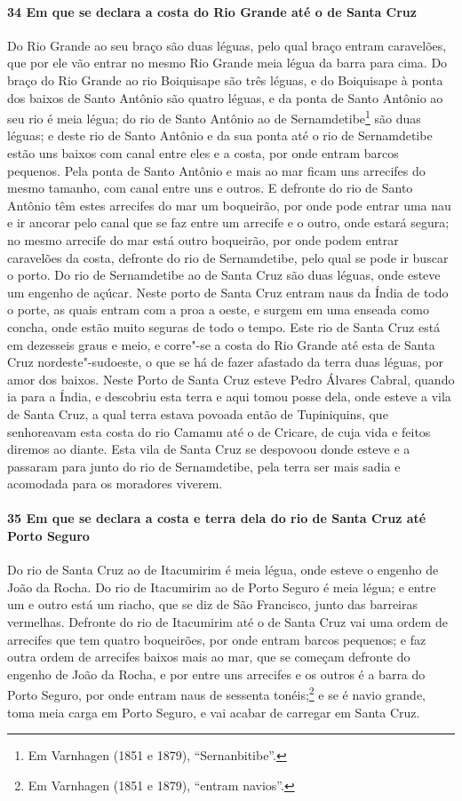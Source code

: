 \begin{linenumbers}
\paragraph{34 Em que se declara a costa do Rio Grande até o de Santa Cruz} \quad
Do Rio Grande ao seu braço são duas léguas, pelo qual braço entram caravelões, que por ele
vão entrar no mesmo Rio Grande meia légua da barra para cima. Do braço do Rio Grande ao
rio Boiquisape são três léguas, e do Boiquisape à ponta dos baixos de Santo Antônio são
quatro léguas, e da ponta de Santo Antônio ao seu rio é meia légua; do rio de Santo
Antônio ao de Sernamdetibe\footnote{ Em Varnhagen (1851 e 1879), ``Sernanbitibe''.} são
duas léguas; e deste rio de Santo Antônio e da sua ponta até o rio de Sernamdetibe estão
uns baixos com canal entre eles e a costa, por onde entram barcos pequenos. Pela ponta de
Santo Antônio e mais ao mar ficam uns arrecifes do mesmo tamanho, com canal entre uns e
outros. E defronte do rio de Santo Antônio têm estes arrecifes do mar um boqueirão, por
onde pode entrar uma nau e ir ancorar pelo canal que se faz entre um arrecife e o outro,
onde estará segura; no mesmo arrecife do mar está outro boqueirão, por onde podem entrar
caravelões da costa, defronte do rio de Sernamdetibe, pelo qual se pode ir buscar o porto.
Do rio de Sernamdetibe ao de Santa Cruz são duas léguas, onde esteve um engenho de açúcar.
Neste porto de Santa Cruz entram naus da Índia de todo o porte, as quais entram com a proa
a oeste, e surgem em uma enseada como concha, onde estão muito seguras de todo o tempo.
Este rio de Santa Cruz está em dezesseis graus e meio, e corre"-se a costa do Rio Grande
até esta de Santa Cruz nordeste"-sudoeste, o que se há de fazer afastado da terra duas
léguas, por amor dos baixos. Neste Porto de Santa Cruz esteve Pedro Álvares Cabral, quando
ia para a Índia, e descobriu esta terra e aqui tomou posse dela, onde esteve a vila de
Santa Cruz, a qual terra estava povoada então de Tupiniquins, que senhoreavam esta costa
do rio Camamu até o de Cricare, de cuja vida e feitos diremos ao diante. Esta vila de
Santa Cruz se despovoou donde esteve e a passaram para junto do rio de Sernamdetibe, pela
terra ser mais sadia e acomodada para os moradores viverem.

\paragraph{35 Em que se declara a costa e terra dela do rio de Santa Cruz até Porto
Seguro} \quad
Do rio de Santa Cruz ao de Itacumirim é meia légua, onde esteve o engenho de João da
Rocha. Do rio de Itacumirim ao de Porto Seguro é meia légua; e entre um e outro está um
riacho, que se diz de São Francisco, junto das barreiras vermelhas. Defronte do rio de
Itacumirim até o de Santa Cruz vai uma ordem de arrecifes que tem quatro boqueirões, por
onde entram barcos pequenos; e faz outra ordem de arrecifes baixos mais ao mar, que se
começam defronte do engenho de João da Rocha, e por entre uns arrecifes e os outros é a
barra do Porto Seguro, por onde entram naus de sessenta tonéis;\footnote{ Em Varnhagen
(1851 e 1879), ``entram navios''.} e se é navio grande, toma meia carga em Porto Seguro, e
vai acabar de carregar em Santa Cruz.


\end{linenumbers}
